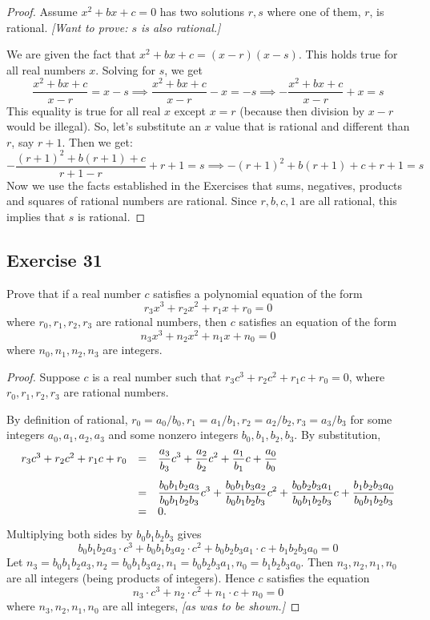 \documentclass[14pt]{extarticle}
\newcommand{\dps}{\displaystyle}
\begin{document}
\begin{proof}
Assume $x^2 + bx + c = 0$ has two solutions $r,s$ where one of them, $r$, is rational. {\it [Want to prove: $s$ is also rational.]}

We are given the fact that $x^2 + bx + c = (x - r)(x - s)$. This holds true for all real numbers $x$. Solving for $s$, we get
\[
\frac{x^2 + bx + c}{x-r} = x - s \implies \frac{x^2 + bx + c}{x-r} -x = - s \implies -\frac{x^2 + bx + c}{x-r} + x = s
\]
This equality is true for all real $x$ except $x = r$ (because then division by $x-r$ would be illegal). So, let's substitute an $x$ value that is rational and different than $r$, say $r+1$. Then we get:
\[
-\frac{(r+1)^2 + b(r+1) + c}{r+1-r} + r+1 = s \implies -(r+1)^2 + b(r+1) + c + r+1 = s
\]
Now we use the facts established in the Exercises that sums, negatives, products and squares of rational numbers are rational. Since $r, b, c, 1$ are all rational, this implies that $s$ is rational.
\end{proof}

\subsection{Exercise 31}
Prove that if a real number $c$ satisfies a polynomial equation of the form
\[
r_3 x^3 + r_2 x^2 + r_1 x + r_0 = 0
\]
where $r_0, r_1, r_2, r_3$ are rational numbers, then $c$ satisfies an equation of the form
\[
n_3 x^3 + n_2 x^2 + n_1 x + n_0 = 0
\]
where $n_0, n_1, n_2, n_3$ are integers.

\begin{proof}
Suppose $c$ is a real number such that $r_3 c^3 + r_2 c^2 + r_1 c + r_0 = 0$, where $r_0, r_1, r_2, r_3$ are rational numbers.

By definition of rational, $r_0 = a_0/b_0, r_1 = a_1/b_1, r_2 = a_2/b_2, r_3 = a_3/b_3$ for some integers $a_0, a_1, a_2, a_3$ and some nonzero integers $b_0, b_1, b_2, b_3$. By substitution,
\[
\begin{array}{rcl}
r_3 c^3 + r_2 c^2 + r_1 c + r_0 & = & \dps\frac{a_3}{b_3}c^3 + \frac{a_2}{b_2}c^2 + \frac{a_1}{b_1}c + \frac{a_0}{b_0} \vspace{0.3cm}\\
& = & \dps\frac{b_0b_1b_2a_3}{b_0b_1b_2b_3}c^3 + \frac{b_0b_1b_3a_2}{b_0b_1b_2b_3}c^2 + \frac{b_0b_2b_3a_1}{b_0b_1b_2b_3}c + \frac{b_1b_2b_3a_0}{b_0b_1b_2b_3} \\
& = & 0.
\end{array}
\]
Multiplying both sides by $b_0b_1b_2b_3$ gives
\[
b_0b_1b_2a_3 \cdot c^3 + b_0b_1b_3a_2 \cdot c^2 + b_0b_2b_3a_1 \cdot c + b_1b_2b_3a_0 = 0
\]
Let $n_3 = b_0b_1b_2a_3, n_2 = b_0b_1b_3a_2, n_1 = b_0b_2b_3a_1, n_0 = b_1b_2b_3a_0$. Then $n_3, n_2, n_1, n_0$ are all integers (being products of integers). Hence $c$ satisfies the equation
\[
n_3 \cdot c^3 + n_2 \cdot c^2 + n_1 \cdot c + n_0 = 0
\]
where $n_3, n_2, n_1, n_0$ are all integers, {\it [as was to be shown.]}
\end{proof}
\end{document}
